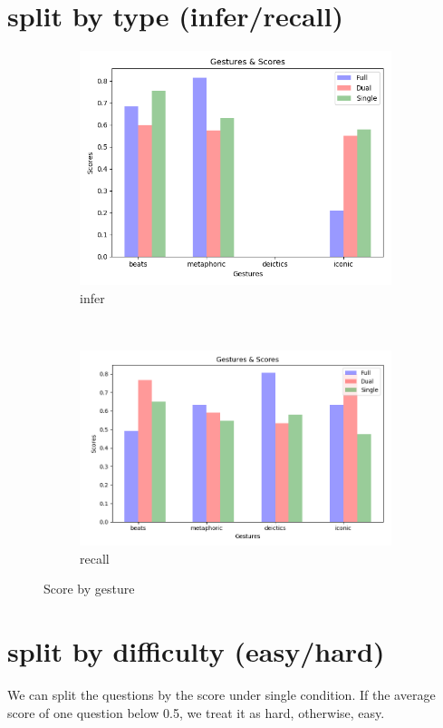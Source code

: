 \documentclass[11pt]{article}
\begin{document}
\section{split by type (infer/recall)}
\begin{figure}[H]
    \centering
    \begin{subfigure}[t]{0.5\textwidth}
        \centering
        \includegraphics[scale=0.5]{infer}
        \caption{infer}
    \end{subfigure}%
    ~ 
    \begin{subfigure}[t]{0.5\textwidth}
        \centering
        \includegraphics[scale=0.5]{recall}
        \caption{recall}
    \end{subfigure}
    \caption{Score by gesture}
\end{figure}

\section{split by difficulty (easy/hard)}
We can split the questions by the score under single condition. 
If the average score of one question below 0.5, we treat it as hard, otherwise, easy.
\end{document}
